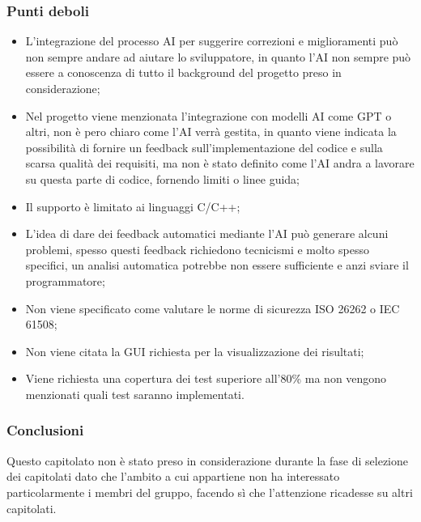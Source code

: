     \subsubsection{Punti deboli}
   \begin{itemize}
    \item L’integrazione del processo AI per suggerire correzioni e miglioramenti può non sempre andare ad aiutare lo sviluppatore, in quanto l’AI non sempre può essere a conoscenza di tutto il background del progetto preso in considerazione;
    \item Nel progetto viene menzionata l’integrazione con modelli AI come GPT o altri, non è pero chiaro come l’AI verrà gestita, in quanto viene indicata la possibilità di fornire un feedback sull’implementazione del codice e sulla scarsa qualità dei requisiti, ma non è stato definito come l’AI andra a lavorare su questa parte di codice, fornendo limiti o linee guida;
    \item Il supporto è limitato ai linguaggi C/C++;
    \item L’idea di dare dei feedback automatici mediante l’AI può generare alcuni problemi, spesso questi feedback richiedono tecnicismi e molto spesso specifici, un analisi automatica potrebbe non essere sufficiente e anzi sviare il programmatore;
    \item Non viene specificato come valutare le norme di sicurezza  ISO 26262 o IEC 61508;
    \item Non viene citata la GUI richiesta per la visualizzazione dei risultati;
    \item  Viene richiesta una copertura dei test superiore all’80\% ma non vengono menzionati quali test saranno implementati.
\end{itemize}
    \subsubsection{Conclusioni}
   Questo capitolato non è stato preso in considerazione durante la fase di selezione dei capitolati dato che l’ambito a cui appartiene non ha interessato particolarmente i membri del gruppo, facendo sì che l’attenzione ricadesse su altri capitolati.
